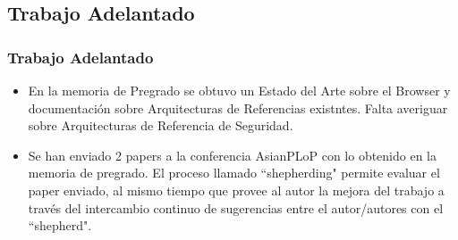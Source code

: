 \documentclass[serif,9pt]{beamer}
\begin{document}
\subsection{Trabajo Adelantado}
\begin{frame}
	\frametitle{Trabajo Adelantado}
	\begin{itemize}
		\item En la memoria de Pregrado se obtuvo un Estado del Arte sobre el Browser y documentación sobre Arquitecturas de Referencias existntes. Falta averiguar sobre Arquitecturas de Referencia de Seguridad.
		\item Se han enviado 2 papers a la conferencia AsianPLoP con lo obtenido en la memoria de pregrado. El proceso llamado ``shepherding" permite evaluar el paper enviado, al mismo tiempo que provee al autor la mejora del trabajo a través del intercambio continuo de sugerencias entre el autor/autores con el ``shepherd".
	\end{itemize}
\end{frame}
\end{document}
